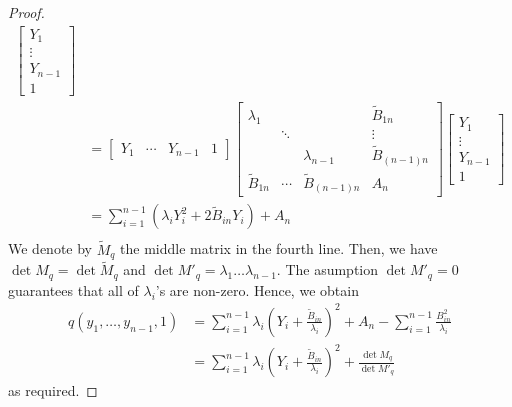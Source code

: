 \documentclass[pdftex,a4paper,12pt]{scrartcl}
\theoremstyle{plain}
\theoremstyle{definition}
\theoremstyle{remark}
\numberwithin{equation}{section}
\begin{document}
\begin{proof}
\[\begin{split}
\begin{bmatrix}
Y_1 \\ \vdots \\ Y_{n-1} \\ 1
\end{bmatrix}
\\
&= 
\begin{bmatrix}
Y_1 & \cdots & Y_{n-1} & 1
\end{bmatrix}
\begin{bmatrix}
\lambda_1  && &\widetilde B_{1n} \\
& \ddots && \vdots \\
&& \lambda_{n-1} & \widetilde B_{(n-1)n} \\
\widetilde B_{1n} & \cdots & \widetilde B_{(n-1)n} & A_n
\end{bmatrix}
\begin{bmatrix}
Y_1 \\ \vdots \\ Y_{n-1} \\ 1
\end{bmatrix}
\\
&= \sum_{i=1}^{n-1} (\lambda_i Y_i^2 + 2\widetilde B_{in}Y_i) + A_n
\\
\end{split}
\]
We denote by $\widetilde M_q$ the middle matrix in the fourth line.
Then, we have $\det M_q = \det \widetilde M_q$ and $\det M'_q =\lambda_1\dots\lambda_{n-1}$.
The asumption $\det M'_q=0$ guarantees that all of $\lambda_i$'s are non-zero.
Hence, we obtain
\[
\begin{split}
q(y_1,\dots,y_{n-1},1)
&= \sum_{i=1}^{n-1} \lambda_i\left(Y_i + \frac{\widetilde B_{in}}{\lambda_i}\right)^2
+ A_n-\sum_{i=1}^{n-1}\frac{B_{in}^2}{\lambda_i} \\
&= \sum_{i=1}^{n-1} \lambda_i\left(Y_i + \frac{\widetilde B_{in}}{\lambda_i}\right)^2 + \frac{\det M_q}{\det M'_q}
\end{split}
\]
as required.
\end{proof}
\end{document}
